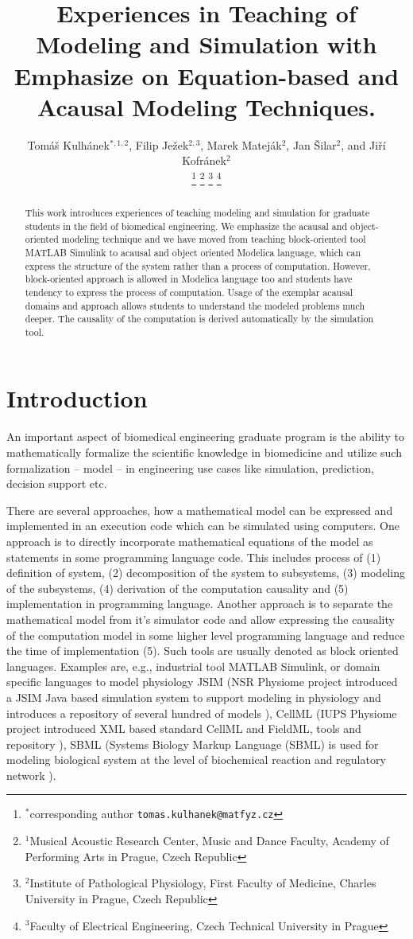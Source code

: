 \documentclass[letterpaper, 10 pt, conference]{ieeeconf}  %
\title{\LARGE \bf
Experiences in Teaching of Modeling and Simulation with Emphasize on Equation-based and Acausal Modeling Techniques.
}
\author{\parbox{3 in}{
Tomáš Kulhánek$^{*,1,2}$, 
Filip Ježek$^{2,3}$, 
Marek Mateják$^{2}$,  
Jan Šilar$^{2}$, 
and Jiří Kofránek$^{2}$}%
\thanks{$^{*}$corresponding author {\tt\small tomas.kulhanek@matfyz.cz}}%
\thanks{$^{1}$Musical Acoustic Research Center, Music and Dance Faculty, Academy of Performing Arts in Prague, Czech Republic}%
\thanks{$^{2}$Institute of Pathological Physiology, First Faculty of Medicine, Charles University in Prague, Czech Republic}%
\thanks{$^{3}$Faculty of Electrical Engineering, Czech Technical University in Prague}%
}
\begin{document}
\maketitle
\thispagestyle{empty}
\pagestyle{empty}


\begin{abstract}
This work introduces experiences of teaching modeling and simulation for graduate students in the field of biomedical engineering. We emphasize the acausal and object-oriented modeling technique and we have moved from teaching block-oriented tool MATLAB Simulink to acausal and object oriented Modelica language, which can express the structure of the system rather than a process of computation. 
However, block-oriented approach is allowed in Modelica language too and students have tendency to express the process of computation. Usage of the exemplar acausal domains and approach allows students to understand the modeled problems much deeper. The causality of the computation is derived automatically by the simulation tool.
\end{abstract}


\section{Introduction}
An important aspect of biomedical engineering graduate program is the ability to mathematically formalize the scientific knowledge in biomedicine and utilize such formalization -- model -- in engineering use cases like simulation, prediction, decision support etc. 

There are several approaches, how a mathematical model can be expressed and implemented in an execution code which can be simulated using computers. One approach is to directly incorporate mathematical equations of the model as statements in some programming language code. This includes process of (1) definition of system, (2) decomposition of the system to subsystems, (3) modeling of the subsystems, (4) derivation of the computation causality and (5) implementation in programming language.
Another approach is to separate the mathematical model from it's simulator code and allow expressing the causality of the computation model in some higher level programming language and reduce the time of implementation (5). Such tools are usually denoted as block oriented languages. Examples are, e.g., industrial tool MATLAB Simulink, or domain specific languages to model physiology JSIM (NSR Physiome project introduced a JSIM Java based simulation system to support modeling in  physiology and introduces a repository of several hundred of models \cite{Butterworth2014}), CellML (IUPS Physiome project introduced XML based standard CellML and FieldML, tools and repository \cite{Yu2011}), SBML (Systems Biology Markup Language (SBML) is used for modeling biological system at the level of biochemical reaction and regulatory network \cite{Hucka2004}).
\end{document}
